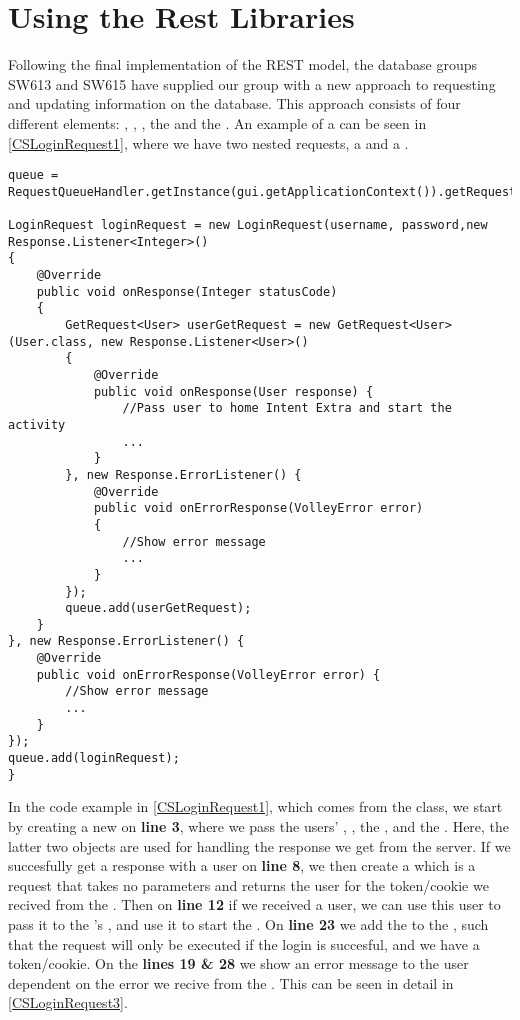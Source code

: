 \section{Using the Rest Libraries}\label{UsingRest}
Following the final implementation of the REST model, the database groups SW613
and SW615 have supplied our group with a new approach to requesting and updating
information on the database. This approach consists of four different
elements: , , ,
the  and the .
An example of a  can be seen in \autoref{CSLoginRequest1},
where we have two nested requests, a  and a
.\nl

\begin{minipage}[H]{\linewidth}
\begin{lstlisting}[caption = Initial request the respective server response object, label = CSLoginRequest1]
queue = RequestQueueHandler.getInstance(gui.getApplicationContext()).getRequestQueue();

LoginRequest loginRequest = new LoginRequest(username, password,new Response.Listener<Integer>() 
{
	@Override
    public void onResponse(Integer statusCode) 
    {
    	GetRequest<User> userGetRequest = new GetRequest<User>(User.class, new Response.Listener<User>() 
    	{
        	@Override
            public void onResponse(User response) {
            	//Pass user to home Intent Extra and start the activity 
            	...
           	}
        }, new Response.ErrorListener() {
        	@Override
            public void onErrorResponse(VolleyError error) 
            {
            	//Show error message
            	...
            }
        });
        queue.add(userGetRequest);
    }
}, new Response.ErrorListener() {
	@Override
    public void onErrorResponse(VolleyError error) {
    	//Show error message
    	...
    }
});
queue.add(loginRequest);
}
\end{lstlisting}
\end{minipage}

In the code example in \autoref{CSLoginRequest1}, which comes from the
 class, we start by creating a new  on
\textbf{line 3}, where we pass the users' , ,
the , and the . Here, the
latter two objects are used for handling the response we get from
the server.
If we succesfully get a response with a user on \textbf{line 8}, we then create
a  which is a request that takes no parameters and returns
the user for the token/cookie we recived from the . Then on
\textbf{line 12} if we received a user, we can use this user to pass it to
the 's , and use it to start the . On
\textbf{line 23} we add the  to the , such that
the request will only be executed if the login is succesful, and we have a
token/cookie. On the \textbf{lines 19 \& 28} we show an error message to the
user dependent on the error we recive from the . This can be
seen in detail in \autoref{CSLoginRequest3}.\nl


